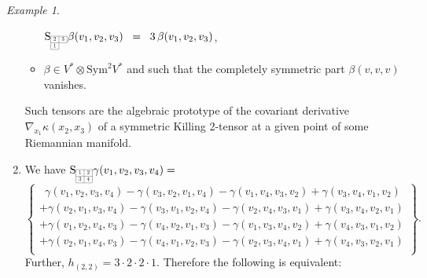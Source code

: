 \documentclass[11pt,a4paper]{article}
\theoremstyle{plain}
\theoremstyle{remark}
\newtheorem{example}{Example}
\newcommand{\Sym}{\mathrm{Sym}}
\newcommand{\rmS}{\mathrm{S}}
\newcommand{\bbS}{\mathbb{S}}
\begin{document}
\begin{example}
\begin{enumerate}
\begin{itemize}
$\rmS_{\scaleto{\begin{array}{|c|c|} 
\cline{1-2}
2 & 3 \\
\cline{1-2}
1 & \multicolumn{1}{c}{} \\
 \cline{1-1}
\end{array}}{12pt}}\beta(v_1,v_2,v_3) \;\;= \;\; 3\, \beta(v_{1},v_{2},v_{3})$,
\item 
$\beta\in V^* \otimes \Sym^2 V^*$ and
such that the completely symmetric part $\beta(v,v,v)$ vanishes. 
\end{itemize}
Such tensors are the algebraic prototype of the
covariant derivative $\nabla_{x_1}\kappa(x_2,x_3)$  of a symmetric Killing 2-tensor at a given point of some Riemannian manifold.
\item  We have $ \rmS_{\scaleto{\begin{array}{|c|c|}
\cline{1-2}
1 & 2 \\
\cline{1-2}
3 & 4 \\
\cline{1-2}
\end{array}}{12pt}}\gamma(v_1,v_2,v_3,v_4) =$ \begin{equation}\label{eq:Young_(2,2)}
 \left \lbrace \begin{array}{c}\;\ \gamma(v_1,v_2,v_3,v_4) - \gamma(v_3,v_2,v_1,v_4) - \gamma(v_1,v_4,v_3,v_2)  + \gamma(v_3,v_4,v_1,v_2)\\
 + \gamma(v_2,v_1,v_3,v_4)  - \gamma(v_3,v_1,v_2,v_4)  - \gamma(v_2,v_4,v_3,v_1)  + \gamma(v_3,v_4,v_2,v_1)\\
+ \gamma(v_1,v_2,v_4,v_3)  - \gamma(v_4,v_2,v_1,v_3)  - \gamma(v_1,v_3,v_4,v_2)  + \gamma(v_4,v_3,v_1,v_2)\\
 + \gamma(v_2,v_1,v_4,v_3)  - \gamma(v_4,v_1,v_2,v_3)  - \gamma(v_2,v_3,v_4,v_1)  + \gamma(v_4,v_3,v_2,v_1)\\
\end{array}
\right \rbrace.
\end{equation}
Further, $h_{(2,2)} = 3\cdot 2\cdot 2\cdot 1$. Therefore the following is equivalent:
\end{enumerate}
\end{example}
\end{document}
